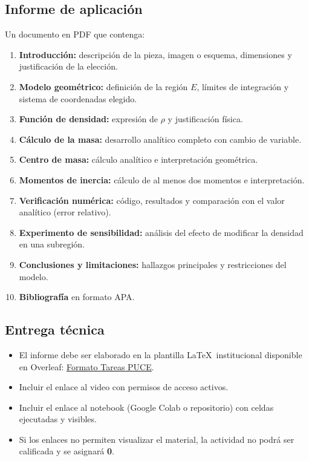 \documentclass[a4,11pt]{aleph-notas}
\begin{document}
\subsection{Informe de aplicación}
Un documento en PDF que contenga:
\begin{enumerate}[leftmargin=*, label={\textbf{\arabic*.}}]
    \item \textbf{Introducción:} descripción de la pieza, imagen o esquema, dimensiones y justificación de la elección.
    \item \textbf{Modelo geométrico:} definición de la región $E$, límites de integración y sistema de coordenadas elegido.
    \item \textbf{Función de densidad:} expresión de $\rho$ y justificación física.
    \item \textbf{Cálculo de la masa:} desarrollo analítico completo con cambio de variable.
    \item \textbf{Centro de masa:} cálculo analítico e interpretación geométrica.
    \item \textbf{Momentos de inercia:} cálculo de al menos dos momentos e interpretación.
    \item \textbf{Verificación numérica:} código, resultados y comparación con el valor analítico (error relativo).
    \item \textbf{Experimento de sensibilidad:} análisis del efecto de modificar la densidad en una subregión.
    \item \textbf{Conclusiones y limitaciones:} hallazgos principales y restricciones del modelo.
    \item \textbf{Bibliografía} en formato APA.
\end{enumerate}

\subsection{Entrega técnica}
\begin{itemize}[leftmargin=*]
    \item El informe debe ser elaborado en la plantilla \LaTeX\ institucional disponible en Overleaf: \href{https://www.overleaf.com/read/vhdczzsymytd#3bf1e4}{Formato Tareas PUCE}.
    \item Incluir el enlace al video con permisos de acceso activos.
    \item Incluir el enlace al notebook (Google Colab o repositorio) con celdas ejecutadas y visibles.
    \item Si los enlaces no permiten visualizar el material, la actividad no podrá ser calificada y se asignará \textbf{0}.
\end{itemize}
\end{document}
